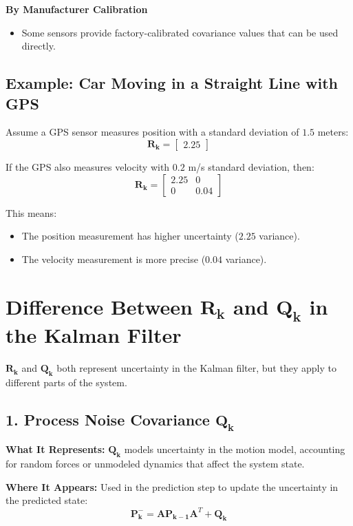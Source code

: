 \documentclass{article}
\begin{document}
\textbf{By Manufacturer Calibration}
\begin{itemize}
    \item Some sensors provide factory-calibrated covariance values that can be used directly.
\end{itemize}

\subsection*{Example: Car Moving in a Straight Line with GPS}
Assume a GPS sensor measures position with a standard deviation of \(1.5\) meters:
\[
\mathbf{R_k} =
\begin{bmatrix}
2.25
\end{bmatrix}
\]

If the GPS also measures velocity with \(0.2\) m/s standard deviation, then:
\[
\mathbf{R_k} =
\begin{bmatrix}
2.25 & 0 \\
0 & 0.04
\end{bmatrix}
\]

This means:
\begin{itemize}
    \item The position measurement has higher uncertainty (\(2.25\) variance).
    \item The velocity measurement is more precise (\(0.04\) variance).
\end{itemize}

\newpage

\section*{Difference Between \(\mathbf{R_k}\) and \(\mathbf{Q_k}\) in the Kalman Filter}

\(\mathbf{R_k}\) and \(\mathbf{Q_k}\) both represent uncertainty in the Kalman filter, but they apply to different parts of the system.

\subsection*{1. Process Noise Covariance \(\mathbf{Q_k}\)}

\textbf{What It Represents:}  
\(\mathbf{Q_k}\) models uncertainty in the motion model, accounting for random forces or unmodeled dynamics that affect the system state.

\textbf{Where It Appears:}  
Used in the prediction step to update the uncertainty in the predicted state:
\[
\mathbf{P_k^-} = \mathbf{A} \mathbf{P_{k-1}} \mathbf{A}^T + \mathbf{Q_k}
\]
\end{document}

